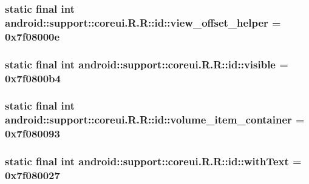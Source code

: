 \hypertarget{classandroid_1_1support_1_1coreui_1_1_r_1_1id_52299d10700ce16c6a22e1c80e6cf1ee}{
\subsubsection[{view\_\-offset\_\-helper}]{\setlength{\rightskip}{0pt plus 5cm}static final int android::support::coreui.R.R::id::view\_\-offset\_\-helper = 0x7f08000e}}
\label{classandroid_1_1support_1_1coreui_1_1_r_1_1id_52299d10700ce16c6a22e1c80e6cf1ee}


\hypertarget{classandroid_1_1support_1_1coreui_1_1_r_1_1id_201181147908eea5ff1379fe556f10a7}{
\subsubsection[{visible}]{\setlength{\rightskip}{0pt plus 5cm}static final int android::support::coreui.R.R::id::visible = 0x7f0800b4}}
\label{classandroid_1_1support_1_1coreui_1_1_r_1_1id_201181147908eea5ff1379fe556f10a7}


\hypertarget{classandroid_1_1support_1_1coreui_1_1_r_1_1id_d7d87fcf33ead5254396de807dffe897}{
\subsubsection[{volume\_\-item\_\-container}]{\setlength{\rightskip}{0pt plus 5cm}static final int android::support::coreui.R.R::id::volume\_\-item\_\-container = 0x7f080093}}
\label{classandroid_1_1support_1_1coreui_1_1_r_1_1id_d7d87fcf33ead5254396de807dffe897}


\hypertarget{classandroid_1_1support_1_1coreui_1_1_r_1_1id_d15e8aef3470cef3ae4d96ef77550aad}{
\subsubsection[{withText}]{\setlength{\rightskip}{0pt plus 5cm}static final int android::support::coreui.R.R::id::withText = 0x7f080027}}
\label{classandroid_1_1support_1_1coreui_1_1_r_1_1id_d15e8aef3470cef3ae4d96ef77550aad}


